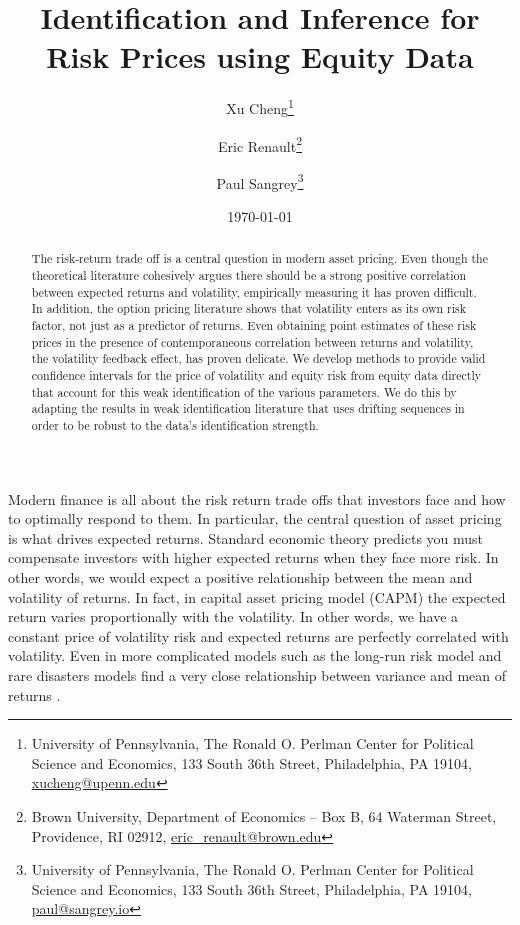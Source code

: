 \documentclass[11pt, letterpaper, twoside, final]{article}
\author{Xu Cheng\thanks{University of Pennsylvania, The Ronald O. Perlman Center for Political Science and
    Economics, 133 South 36th Street, Philadelphia, PA 19104, \href{mailto:xucheng@upenn.edu}{xucheng@upenn.edu}}
    \and 
    Eric Renault\thanks{Brown University, Department of Economics -- Box B, 64 Waterman Street, Providence, RI
    02912, \href{mailto:eric_renault@brown.edu}{eric\_renault@brown.edu}}
    \and 
    Paul Sangrey\thanks{University of Pennsylvania, The Ronald O. Perlman Center for Political Science and
    Economics, 133 South 36th Street, Philadelphia, PA 19104, \href{mailto:paul@sangrey.io}{paul@sangrey.io}}}
\title{Identification and Inference for Risk Prices using Equity Data}
\date{\today}
\begin{document}
\begin{titlepage}


    \maketitle
    \thispagestyle{empty}
    \addtocounter{page}{-1}

    \begin{abstract} \singlespacing \noindent 
        The risk-return trade off is a central question in modern asset pricing. 
        Even though the theoretical literature cohesively argues there should be a strong positive correlation
        between expected returns and volatility, empirically measuring it has proven difficult. 
        In addition, the option pricing literature shows that volatility enters as its own risk factor, not just
        as a predictor of returns.
        Even obtaining point estimates of these risk prices in the presence of contemporaneous correlation between
        returns and volatility, the  volatility feedback effect, has proven delicate.
        We develop methods to provide  valid confidence intervals for the price of volatility and equity risk from
        equity data directly that account for this weak identification of the various parameters. 
        We do this by adapting the results in weak identification literature that uses drifting sequences in order
        to be robust to the data's identification strength. 
    \end{abstract}



\end{titlepage}

{}

Modern finance is all about the risk return trade offs that investors face and how to optimally respond to them. 
In particular, the central question of asset pricing is what drives expected returns.
Standard economic theory predicts you must compensate investors with higher expected returns when they face more
risk.
In other words, we would expect a positive relationship between the mean and volatility of returns.
In fact, in  capital asset pricing model (CAPM) the expected
return varies proportionally with the volatility. 
In other words, we have a constant price of volatility risk and expected returns are perfectly correlated with
volatility.
Even in more complicated models such as the long-run risk model and rare disasters models find a very close
relationship between variance and mean of returns \parencite{bansal2014volatility, wachter2013can}.
\end{document}
